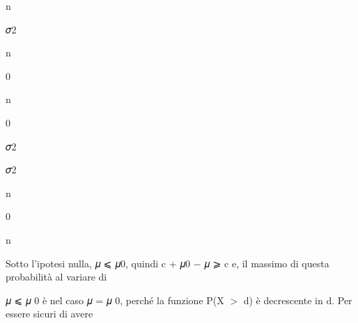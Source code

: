 \documentclass[a4paper,portrait,12pt]{article}
\begin{document}
\begin{flushleft}
n
\end{flushleft}





\begin{flushleft}
𝜎2
\end{flushleft}





\begin{flushleft}
n
\end{flushleft}





0





\begin{flushleft}
n
\end{flushleft}





0





\begin{flushleft}
𝜎2
\end{flushleft}





\begin{flushleft}
𝜎2
\end{flushleft}





\begin{flushleft}
n
\end{flushleft}





0





\begin{flushleft}
n
\end{flushleft}





\begin{flushleft}
Sotto l'ipotesi nulla, 𝜇 ⩽ 𝜇0, quindi c + 𝜇0 $-$ 𝜇 ⩾ c e, il massimo di questa probabilit\`{a} al variare di
\end{flushleft}


\begin{flushleft}
𝜇 ⩽ 𝜇 0 \`{e} nel caso 𝜇 = 𝜇 0, perch\'{e} la funzione P(X $>$ d) \`{e} decrescente in d. Per essere sicuri di avere
\end{flushleft}
\end{document}
